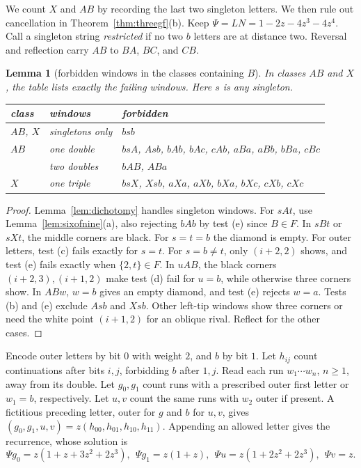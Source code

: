 \documentclass[12pt]{article}
\theoremstyle{plain}
\newtheorem{lemma}[theorem]{Lemma}
\theoremstyle{definition}
\theoremstyle{remark}
\begin{document}
We count $X$ and $AB$ by recording the last two singleton letters.
We then rule out cancellation in Theorem~\ref{thm:threegf}(b).
Keep $\Psi=LN=1-2z-4z^3-4z^4$. Call a singleton string
\emph{restricted} if no two $b$ letters are at distance two.
Reversal and reflection carry $AB$ to $BA$, $BC$, and $CB$.

\begin{lemma}[forbidden windows in the classes containing $B$]\label{lem:threewindows}
In classes $AB$ and $X$, the table lists exactly the failing windows.
Here $s$ is any singleton.
\begin{center}\small
\begin{tabular}{@{}lll@{}}
\toprule
class & windows & forbidden \\
\midrule
$AB$, $X$ & singletons only & $bsb$ \\
$AB$ & one double & $bsA$, $Asb$, $bAb$, $bAc$, $cAb$, $aBa$, $aBb$, $bBa$, $cBc$ \\
 & two doubles & $bAB$, $ABa$ \\
$X$ & one triple & $bsX$, $Xsb$, $aXa$, $aXb$, $bXa$, $bXc$, $cXb$, $cXc$ \\
\bottomrule
\end{tabular}
\end{center}
\end{lemma}

\begin{proof}
Lemma~\ref{lem:dichotomy} handles singleton windows.
For $sAt$, use Lemma~\ref{lem:sixofnine}(a), also rejecting $bAb$
by test (e) since $B\in F$.
In $sBt$ or $sXt$, the middle corners are black. For $s=t=b$ the
diamond is empty. For outer letters, test (c) fails exactly for $s=t$.
For $s=b\ne t$, only $(i+2,2)$ shows, and test (e) fails exactly
when $\{2,t\}\in F$.
In $uAB$, the black corners $(i+2,3),(i+1,2)$ make test (d) fail
for $u=b$, while otherwise three corners show.
In $ABw$, $w=b$ gives an empty diamond, and test (e) rejects $w=a$.
Tests (b) and (e) exclude $Asb$ and $Xsb$.
Other left-tip windows show three corners or need the white point
$(i+1,2)$ for an oblique rival. Reflect for the other cases.
\end{proof}

Encode outer letters by bit $0$ with weight $2$, and $b$ by bit $1$.
Let $h_{ij}$ count continuations after bits $i,j$, forbidding $b$ after $1,j$.
Read each run $w_1\cdots w_n$, $n\ge1$, away from its double.
Let $g_0,g_1$ count runs with a prescribed outer first letter or $w_1=b$,
respectively. Let $u,v$ count the same runs with $w_2$ outer if present.
A fictitious preceding letter, outer for $g$ and $b$ for $u,v$,
gives $(g_0,g_1,u,v)=z(h_{00},h_{01},h_{10},h_{11})$.
Appending an allowed letter gives the recurrence, whose solution is
\begin{equation}\label{eq:runs}
\Psi g_0=z(1+z+3z^2+2z^3),\ \ \Psi g_1=z(1+z),\ \ \Psi u=z(1+2z^2+2z^3),\ \ \Psi v=z.
\end{equation}
\end{document}
